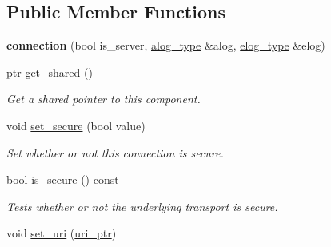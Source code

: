 \subsection*{Public Member Functions}
\begin{DoxyCompactItemize}
\item 
\mbox{\label{classwebsocketpp_1_1transport_1_1stub_1_1connection_afaa38053f4adde031a537274f5826dbb}} 
{\bfseries connection} (bool is\+\_\+server, \mbox{\hyperlink{classwebsocketpp_1_1transport_1_1stub_1_1connection_ab3b726566d87b32c0ea2fac987a12881}{alog\+\_\+type}} \&alog, \mbox{\hyperlink{classwebsocketpp_1_1transport_1_1stub_1_1connection_a24a76b753919af96513f67b3e51f7ecd}{elog\+\_\+type}} \&elog)
\item 
\mbox{\label{classwebsocketpp_1_1transport_1_1stub_1_1connection_a57eaed224b575c038d15fe0e48523e9f}} 
\mbox{\hyperlink{classwebsocketpp_1_1transport_1_1stub_1_1connection_aeb856d2a6734d303e13bed57c3d1081b}{ptr}} \mbox{\hyperlink{classwebsocketpp_1_1transport_1_1stub_1_1connection_a57eaed224b575c038d15fe0e48523e9f}{get\+\_\+shared}} ()
\begin{DoxyCompactList}\small\item\em Get a shared pointer to this component. \end{DoxyCompactList}\item 
void \mbox{\hyperlink{classwebsocketpp_1_1transport_1_1stub_1_1connection_afc1b6434bfe02d2efcda9e2887af83c4}{set\+\_\+secure}} (bool value)
\begin{DoxyCompactList}\small\item\em Set whether or not this connection is secure. \end{DoxyCompactList}\item 
bool \mbox{\hyperlink{classwebsocketpp_1_1transport_1_1stub_1_1connection_ab3cc0e613fc79838003c681d55ffa746}{is\+\_\+secure}} () const
\begin{DoxyCompactList}\small\item\em Tests whether or not the underlying transport is secure. \end{DoxyCompactList}\item 
void \mbox{\hyperlink{classwebsocketpp_1_1transport_1_1stub_1_1connection_ae542c0f0813c3943f8cf9739ead09961}{set\+\_\+uri}} (\mbox{\hyperlink{namespacewebsocketpp_aae370ea5ac83a8ece7712cb39fc23f5b}{uri\+\_\+ptr}})

\end{DoxyCompactItemize}
